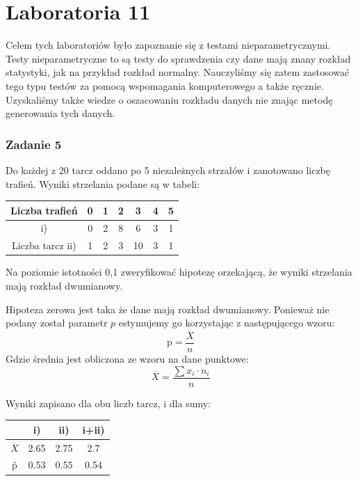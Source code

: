\documentclass{article}
\begin{document}
\newpage
\begin{center}
\tiny
{}
\end{center}

\newpage
\part{Laboratoria 11}
Celem tych laboratoriów było zapoznanie się z testami nieparametrycznymi. Testy nieparametryczne to są testy do sprawdzenia czy dane mają znany rozkład statystyki, jak na przykład rozkład normalny. Nauczyliśmy się zatem zastosować tego typu testów za pomocą wspomagania komputerowego a także ręcznie. Uzyskaliśmy także wiedze o oszacowaniu rozkładu danych nie znając metodę generowania tych danych.

\section{Zadanie 5}
Do każdej z 20 tarcz oddano po 5 niezależnych strzałów i zanotowano liczbę trafień. Wyniki strzelania podane są w tabeli:
\begin{center} \begin{tabular}{|c|c|c|c|c|c|c|} \hline
Liczba trafień & 0 & 1 & 2 & 3 & 4 & 5 \\ \hline
i) & 0 & 2 & 8 & 6 & 3 & 1 \\ \cline{2-7}
Liczba tarcz ii) & 1 & 2 & 3 & 10 & 3 & 1 \\ \hline
\end{tabular} \end{center}
Na poziomie istotności 0,1 zweryfikować hipotezę orzekającą, że wyniki strzelania mają rozkład dwumianowy. \\ \par

Hipoteza zerowa jest taka że dane mają rozkład dwumianowy. Ponieważ nie podany został parametr $p$ estymujemy go korzystając z następującego wzoru:
\[ \text{\^p} = \frac{\overline{X}}{n} \]
Gdzie średnia jest obliczona ze wzoru na dane punktowe:
\[ \overline{X} = \frac{\sum x_i \cdot n_i}{n} \]

Wyniki zapisano dla obu liczb tarcz, i dla sumy:
\begin{center} \begin{tabular}{|c|c|c|c|} \hline
 & i) & ii) & i+ii) \\ \hline
$\overline{X}$ & 2.65	& 2.75 & 2.7 \\ \hline
\^p & 0.53 & 0.55 & 0.54 \\ \hline
\end{tabular} \end{center}
\end{document}
